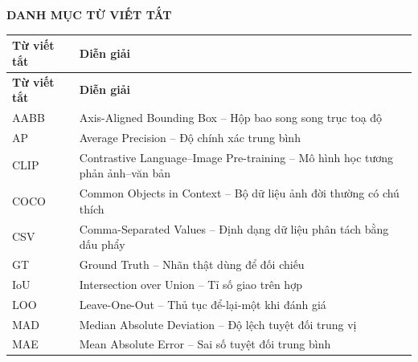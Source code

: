 \newpage
\thispagestyle{plain}

\begin{center}
    {\bfseries\Large DANH MỤC TỪ VIẾT TẮT}
\end{center}

\vspace{0.8cm}

\renewcommand{\arraystretch}{1.25}

\begin{longtable}{>{\centering\arraybackslash}p{3.2cm} p{10.5cm}}
    \toprule
    \textbf{Từ viết tắt} & \textbf{Diễn giải} \\
    \midrule
    \endfirsthead

    \toprule
    \textbf{Từ viết tắt} & \textbf{Diễn giải} \\
    \midrule
    \endhead

    AABB & Axis-Aligned Bounding Box -- Hộp bao song song trục toạ độ \\

    AP & Average Precision -- Độ chính xác trung bình \\

    CLIP & Contrastive Language--Image Pre-training -- Mô hình học tương phản ảnh--văn bản \\

    COCO & Common Objects in Context -- Bộ dữ liệu ảnh đời thường có chú thích \\

    CSV & Comma-Separated Values -- Định dạng dữ liệu phân tách bằng dấu phẩy \\

    GT & Ground Truth -- Nhãn thật dùng để đối chiếu \\

    IoU & Intersection over Union -- Tỉ số giao trên hợp \\

    LOO & Leave-One-Out -- Thủ tục để-lại-một khi đánh giá \\

    MAD & Median Absolute Deviation -- Độ lệch tuyệt đối trung vị \\

    MAE & Mean Absolute Error -- Sai số tuyệt đối trung bình \\


\end{longtable}
